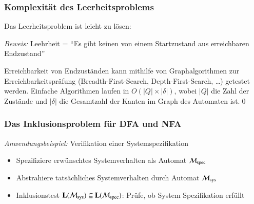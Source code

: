 \documentclass[aspectratio=1610,onlymath]{beamer}
\begin{document}
\begin{frame}\frametitle{Komplexität des Leerheitsproblems}

Das Leerheitsproblem ist leicht zu lösen:


\pause
\emph{Beweis:} Leehrheit = "`Es gibt keinen von einem Startzustand aus erreichbaren Endzustand"'
\bigskip

Erreichbarkeit von Endzuständen kann mithilfe von Graphalgorithmen zur Erreichbarkeitspräfung (Breadth-First-Search, Depth-First-Search, \ldots) getestet werden. Einfache Algorithmen laufen in $O(|Q|\times |\delta|)$, wobei $|Q|$ die Zahl der Zustände und $|\delta|$ die Gesamtzahl der Kanten im Graph des Automaten ist.\qed

\end{frame}

\begin{frame}\frametitle{Das Inklusionsproblem für DFA und NFA}


\emph{Anwendungsbeispiel:}
Verifikation einer Systemspezifikation
\begin{itemize}
\item Spezifiziere erwünschtes Systemverhalten als Automat $\mathcal{M}_{\text{spec}}$
\item Abstrahiere tatsächliches Systemverhalten durch Automat $\mathcal{M}_{\text{sys}}$
\item Inklusionstest $\textbf{\textcolor{black}{L}}(\mathcal{M}_{\text{sys}})\subseteq\textbf{\textcolor{black}{L}}(\mathcal{M}_{\text{spec}})$: Prüfe, ob System Spezifikation erfüllt
\end{itemize}

\end{frame}
\end{document}
